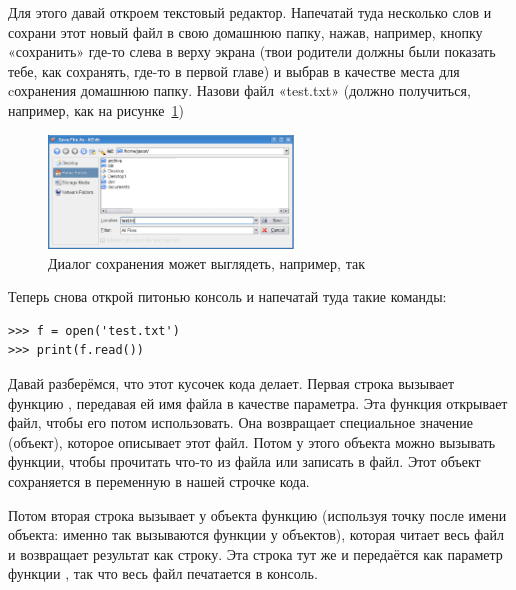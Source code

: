 \begin{LINUX}
Для этого давай откроем текстовый редактор. Напечатай туда несколько слов и сохрани этот новый файл в свою домашнюю папку, нажав, например, кнопку «сохранить» где-то слева в верху экрана (твои родители должны были показать тебе, как сохранять, где-то в первой главе) и выбрав в качестве места для cохранения домашнюю папку. Назови файл «test.txt» (должно получиться, например, как на рисунке~\ref{fig19})
	
\begin{figure}
\begin{center}
\includegraphics[width=65mm]{../en/figure19.eps}
\end{center}
\caption{Диалог сохранения может выглядеть, например, так}\label{fig19}
\end{figure}

Теперь снова открой питонью консоль и напечатай туда такие команды:

\begin{listing}
\begin{verbatim}
>>> f = open('test.txt')
>>> print(f.read())
\end{verbatim}
\end{listing}

\end{LINUX}

Давай разберёмся, что этот кусочек кода делает. Первая строка вызывает функцию , передавая ей имя файла в качестве параметра. Эта функция открывает файл, чтобы его потом использовать. Она возвращает специальное значение (объект), которое описывает этот файл. Потом у этого объекта можно вызывать функции, чтобы прочитать что-то из файла или записать в файл. Этот объект сохраняется в переменную  в нашей строчке кода.

Потом вторая строка вызывает у объекта  функцию  (используя точку после имени объекта: именно так вызываются функции у объектов), которая читает весь файл и возвращает результат как строку. Эта строка тут же и передаётся как параметр функции , так что весь файл печатается в консоль.

\vspace{6pt}
\begin{center}
\end{center}

